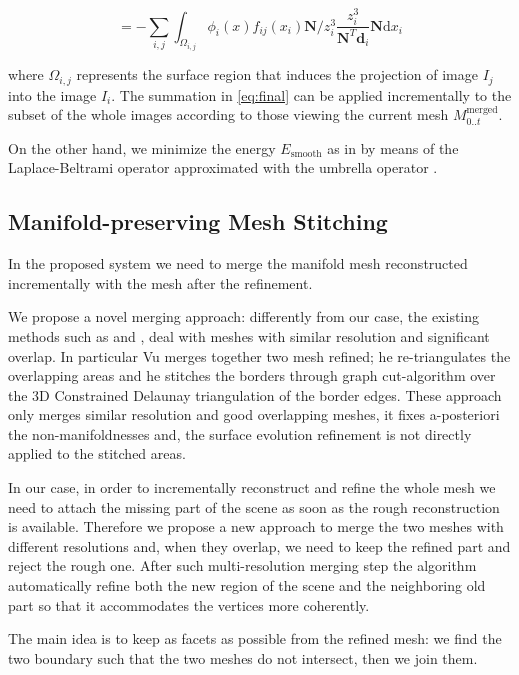 \begin{equation}
\label{eq:final}
  =  - \sum_{i,j} \int_{\mathit{\Omega_{i,j}}} \phi_i(x)  f_{ij}(x_i)  \mathbf{N}/z_i^3 \frac{z_i^3}{\mathbf{N}^T \mathbf{d}_i }\mathbf{N} \textrm{d}x_i
\end{equation}

where $\Omega_{i,j}$ represents the surface region that induces the projection of image $I_j$ into the image $I_i$.
The summation in \eqref{eq:final} can be applied incrementally to the subset of the whole images according to those viewing the current mesh $M_{0..t}^{\text{merged}}$.

On the other hand, we minimize the energy $E_{\textrm{smooth}}$ as in \cite{vu_et_al_2012} by means of the Laplace-Beltrami operator approximated with the umbrella operator \cite{wardetzky2007discrete}.



\subsection{Manifold-preserving Mesh Stitching}
\label{sec:Mesh_merging}
In the proposed system we need to merge the manifold mesh reconstructed incrementally with the mesh after the refinement.

We propose a novel merging approach: differently from our case, the existing methods such as \cite{turk1994zippered} and \cite{VuPhD011},  deal with meshes with similar resolution and significant overlap. 
In particular  Vu  \cite{VuPhD011} merges together two mesh refined; he re-triangulates the overlapping areas and he stitches the borders through graph cut-algorithm over the 3D Constrained Delaunay triangulation of the border edges.
These approach only merges similar resolution and good overlapping meshes, it fixes a-posteriori the non-manifoldnesses and, the surface evolution refinement is not directly applied to the stitched areas.


In our case, in order to incrementally reconstruct and refine the whole mesh we need to attach the missing part of the scene as soon as the rough reconstruction is available. Therefore we propose a new approach to merge the two meshes with  different resolutions and, when they overlap, we need to keep the refined part and reject the rough one.
After such multi-resolution merging step the algorithm automatically refine both the new region of the scene and the neighboring old part so that it accommodates the vertices more coherently.


The main idea is to keep as facets as possible from the refined mesh: we find the two boundary such that the two meshes do not intersect, then we join them.

